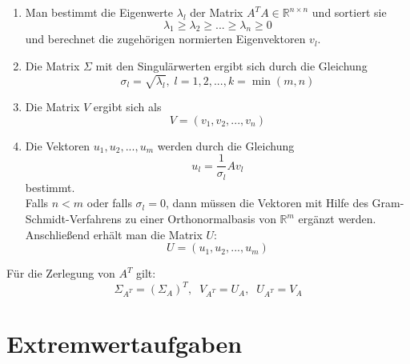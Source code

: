 \documentclass[a4paper,twocolumn,10pt]{article}
\begin{document}
\begin{enumerate}
\item Man bestimmt die Eigenwerte $\lambda_l$ der Matrix $A^TA\in\mathbb{R}^{n\times n}$ und sortiert sie
\begin{equation*}
\lambda_1\geq \lambda_2\geq ...\geq\lambda_n\geq 0
\end{equation*}
und berechnet die zugehörigen normierten Eigenvektoren $v_l$.
\item Die Matrix $\Sigma$ mit den Singulärwerten ergibt sich durch die Gleichung
\begin{equation*}
\sigma_l=\sqrt{\lambda_l},\;l=1,2,...,k=\min(m,n)
\end{equation*}
\item Die Matrix $V$ ergibt sich als
\begin{equation*}
V=(v_1,v_2,...,v_n)
\end{equation*}
\item Die Vektoren $u_1,u_2,...,u_m$ werden durch die Gleichung
\begin{equation*}
u_l=\frac{1}{\sigma_l}Av_l
\end{equation*}
bestimmt.\\
Falls $n<m$ oder falls $\sigma_l =0$, dann müssen die Vektoren mit Hilfe des Gram-Schmidt-Verfahrens zu einer Orthonormalbasis von $\mathbb{R}^m$ ergänzt werden.\\
Anschließend erhält man die Matrix $U$:
\begin{equation*}
U=(u_1,u_2,...,u_m)
\end{equation*}
\end{enumerate}
Für die Zerlegung von $A^T$ gilt:
\begin{equation*}
\Sigma_{A^T}=(\Sigma_A)^T,\;\;V_{A^T}=U_A,\;\;U_{A^T}=V_A
\end{equation*}

\section{Extremwertaufgaben}
\end{document}

